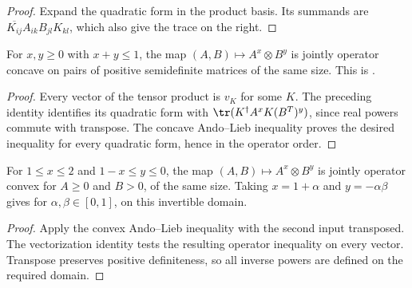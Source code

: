 \begin{proof}\leanok
    Expand the quadratic form in the product basis. Its summands are
    $\overline{K_{ij}}A_{ik}B_{jl}K_{kl}$, which also give the trace on the right.
\end{proof}

\begin{theorem}
    \label{thm:rpow_kronecker_rpow_concave}
    \leanok
    For $x,y\geq0$ with $x+y\leq1$, the map
    $(A,B)\mapsto A^x\otimes B^y$ is jointly operator concave on pairs of
    positive semidefinite matrices of the same size. This is
    \cite[Corollary~5.5(1)]{Wolf2012Quantum}.
\end{theorem}

\begin{proof}\leanok
    Every vector of the tensor product is $v_K$ for some $K$.
    The preceding identity identifies its quadratic form with
    $\tr(K^\dagger A^xK(B^T)^y)$, since real powers commute with transpose.
    The concave Ando--Lieb inequality proves the desired inequality for every
    quadratic form, hence in the operator order.
\end{proof}

\begin{theorem}
    \label{thm:rpow_kronecker_rpow_convex}
    \leanok
    For $1\leq x\leq2$ and $1-x\leq y\leq0$, the map
    $(A,B)\mapsto A^x\otimes B^y$ is jointly operator convex for $A\geq0$
    and $B>0$, of the same size. Taking $x=1+\alpha$ and
    $y=-\alpha\beta$ gives \cite[Corollary~5.5(3)]{Wolf2012Quantum}
    for $\alpha,\beta\in[0,1]$, on this invertible domain.
\end{theorem}

\begin{proof}\leanok
    Apply the convex Ando--Lieb inequality with the second input transposed.
    The vectorization identity tests the resulting operator inequality on
    every vector. Transpose preserves positive definiteness, so all inverse
    powers are defined on the required domain.
\end{proof}
